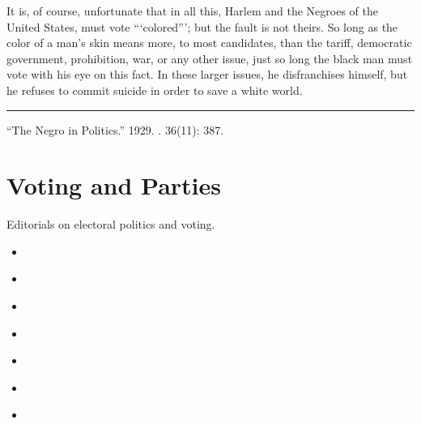 \documentclass[letterpaper,10pt,english]{jupyterBook}
\begin{document}
\sphinxAtStartPar
It is, of course, unfortunate that in all this, Harlem and the Negroes of the United States, must vote “‘colored”’; but the fault is not theirs. So long as the color of a man’s skin means more, to most candidates, than the tariff, democratic government, prohibition, war, or any other issue, just so long  the black man must vote with his eye on this fact. In these larger issues, he disfranchises himself, but he refuses to commit suicide in order to save a white world.


\bigskip\hrule\bigskip


\sphinxAtStartPar
{} “The Negro in Politics.” 1929. . 36(11): 387.


\section{Voting and Parties}
\label{\detokenize{Sections/electoral:voting-and-parties}}\label{\detokenize{Sections/electoral::doc}}
\sphinxAtStartPar
Editorials on electoral politics and voting.
\begin{itemize}
\item {} 
\sphinxAtStartPar
{\hyperref[\detokenize{Volumes/04/04/politics::doc}]{}}

\item {} 
\sphinxAtStartPar
{\hyperref[\detokenize{Volumes/15/01/oath_of_the_negro_voter::doc}]{}}

\item {} 
\sphinxAtStartPar
{\hyperref[\detokenize{Volumes/21/02/unreal_campaign::doc}]{}}

\item {} 
\sphinxAtStartPar
{\hyperref[\detokenize{Volumes/22/01/drive::doc}]{}}

\item {} 
\sphinxAtStartPar
{\hyperref[\detokenize{Volumes/34/04/chicago::doc}]{}}

\item {} 
\sphinxAtStartPar
{\hyperref[\detokenize{Volumes/35/11/on_the_fence::doc}]{}}

\item {} 
\sphinxAtStartPar
{\hyperref[\detokenize{Volumes/35/11/third_party::doc}]{}}

\end{itemize}
\end{document}
